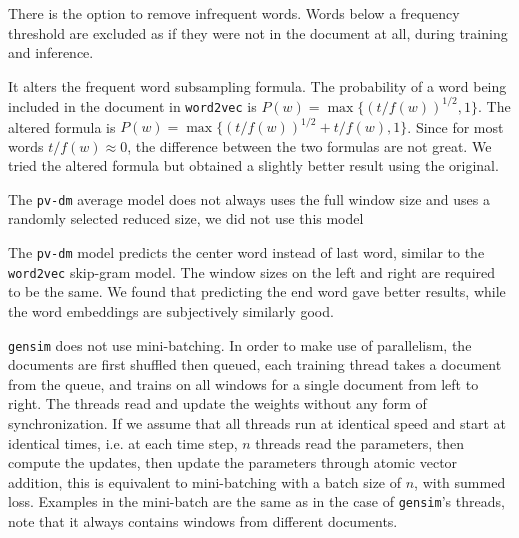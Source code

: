 \documentclass{article}
\begin{document}
\begin{appendices}
There is the option to remove infrequent words. Words below a frequency threshold are excluded as if they were not in the document at all, during training and inference.

It alters the frequent word subsampling formula. The probability of a word being included in the document in \texttt{word2vec} is $P(w)=\max\{(t/f(w))^{1/2}, 1\}$. The altered formula is $P(w)=\max\{(t/f(w))^{1/2} + {t/f(w)}, 1\}$. Since for most words $t/f(w)\approx 0$, the difference between the two formulas are not great. We tried the altered formula but obtained a slightly better result using the original.

The \texttt{pv-dm} average model does not always uses the full window size and uses a randomly selected reduced size, we did not use this model

The \texttt{pv-dm} model predicts the center word instead of last word, similar to the \texttt{word2vec} skip-gram model. The window sizes on the left and right are required to be the same. We found that predicting the end word gave better results, while the word embeddings are subjectively similarly good.

\texttt{gensim} does not use mini-batching. In order to make use of parallelism, the documents are first shuffled then queued, each training thread takes a document from the queue, and trains on all windows for a single document from left to right. The threads read and update the weights without any form of synchronization. If we assume that all threads run at identical speed and start at identical times, i.e. at each time step, $n$ threads read the parameters, then compute the updates, then update the parameters through atomic vector addition, this is equivalent to mini-batching with a batch size of $n$, with summed loss. Examples in the mini-batch are the same as in the case of \texttt{gensim}'s threads, note that it always contains windows from different documents.

\end{appendices}

{}

\end{document}
